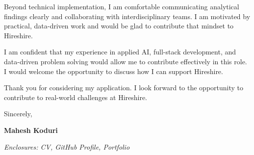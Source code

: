 \documentclass[11pt,a4paper]{letter}
\begin{document}
Beyond technical implementation, I am comfortable communicating analytical findings clearly and collaborating with interdisciplinary teams. I am motivated by practical, data-driven work and would be glad to contribute that mindset to Hireshire.

I am confident that my experience in applied AI, full-stack development, and data-driven problem solving would allow me to contribute effectively in this role. I would welcome the opportunity to discuss how I can support Hireshire.

Thank you for considering my application. I look forward to the opportunity to contribute to real-world challenges at Hireshire.

\vspace{0.5cm}

Sincerely,

\vspace{0.8cm}

\textbf{ Mahesh Koduri }

\vspace{0.5cm}

\textit{Enclosures: CV, GitHub Profile, Portfolio}
\end{document}
